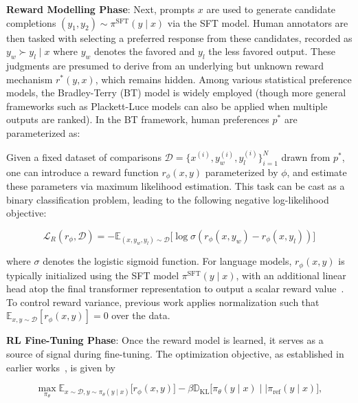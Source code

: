 \textbf{Reward Modelling Phase}: Next, prompts $x$ are used to generate candidate completions $(y_1, y_2)\sim \pi^\text{SFT}(y \mid x)$ via the SFT model. Human annotators are then tasked with selecting a preferred response from these candidates, recorded as $y_w\succ y_l \mid x$ where $y_w$ denotes the favored and $y_l$ the less favored output. These judgments are presumed to derive from an underlying but unknown reward mechanism $r^*(y, x)$, which remains hidden. Among various statistical preference models, the Bradley-Terry (BT) model \cite{bradley1952rankanalysis} is widely employed (though more general frameworks such as Plackett-Luce models \citep{plackett1975analysis, luce2012individual} can also be applied when multiple outputs are ranked). In the BT framework, human preferences $p^*$ are parameterized as:

Given a fixed dataset of comparisons $\mathcal{D} = \bigl\{x^{(i)}, y_w^{(i)}, y_l^{(i)}\bigr\}_{i=1}^N$ drawn from $p^*$, one can introduce a reward function $r_{\phi}(x, y)$ parameterized by $\phi$, and estimate these parameters via maximum likelihood estimation. This task can be cast as a binary classification problem, leading to the following negative log-likelihood objective:

\begin{equation}\label{eq:reward_model}
    \mathcal{L}_R(r_{\phi}, \mathcal{D}) = -\mathbb{E}_{(x, y_w, y_l)\sim \mathcal{D}}\bigl[\log \sigma(r_{\phi}(x, y_w) - r_{\phi}(x, y_l))\bigr]
\end{equation}

where $\sigma$ denotes the logistic sigmoid function. For language models, $r_{\phi}(x, y)$ is typically initialized using the SFT model $\pi^\text{SFT}(y \mid x)$, with an additional linear head atop the final transformer representation to output a scalar reward value~\cite{ziegler2020finetuning}. To control reward variance, previous work applies normalization such that $\mathbb{E}_{x,y\sim \mathcal{D}}\left[r_\phi(x, y)\right]=0$ over the data.

\textbf{RL Fine-Tuning Phase}: Once the reward model is learned, it serves as a source of signal during fine-tuning. The optimization objective, as established in earlier works~\citep{jaques2017sequence, jaques2020human}, is given by

\begin{equation}\label{eq:RL}
\max_{\pi_{\theta}}  \mathbb{E}_{x\sim \mathcal{D}, y\sim \pi_{\theta}(y \mid x)}\bigl[r_{\phi}(x, y)\bigr] - \beta\mathbb{D}_{\textrm{KL}}\bigl[\pi_{\theta}(y\mid x)\mid \mid \pi_\text{ref}(y\mid x)\bigr],
\end{equation}

